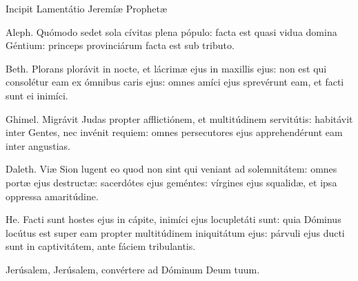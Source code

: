 
Incipit Lamentátio Jeremíæ Prophetæ

Aleph. Quómodo sedet sola cívitas plena pópulo: facta est quasi vidua domina Géntium: princeps provinciárum facta est sub tributo.

Beth. Plorans plorávit in nocte, et lácrimæ ejus in maxillis ejus: non est qui consolétur eam ex ómnibus caris ejus: omnes amíci ejus sprevérunt eam, et facti sunt ei inimíci.

Ghimel. Migrávit Judas propter afflictiónem, et multitúdinem servitútis: habitávit inter Gentes, nec invénit requiem: omnes persecutores ejus apprehendérunt eam inter angustias.

Daleth. Viæ Sion lugent eo quod non sint qui veniant ad solemnitátem: omnes portæ ejus destructæ: sacerdótes ejus geméntes: vírgines ejus squalidæ, et ipsa oppressa amaritúdine.

He. Facti sunt hostes ejus in cápite, inimíci ejus locupletáti sunt: quia Dóminus locútus est super eam propter multitúdinem iniquitátum ejus: párvuli ejus ducti sunt in captivitátem, ante fáciem tribulantis.

Jerúsalem, Jerúsalem, convértere ad Dóminum Deum tuum.
\par